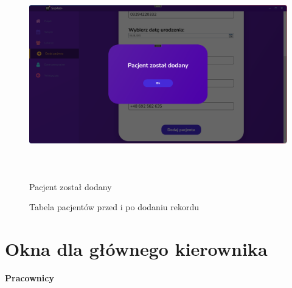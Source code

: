 \begin{figure}[H]
\begin{center}
    \includegraphics[height=9cm]{images/pacj_zost_dod.png}
    \caption{Pacjent został dodany}
\end{center}
\end{figure}

\begin{figure}[H]
\centering
    \caption{Tabela pacjentów przed i po dodaniu rekordu}
\end{figure}

\section{Okna dla głównego kierownika}
\Large\textbf{{Pracownicy}}

